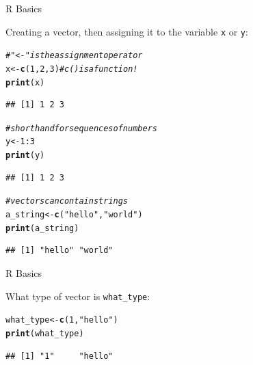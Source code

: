 \documentclass[svgnames,smaller]{beamer}\usepackage[]{graphicx}\usepackage[]{color}
\makeatletter
\newcommand{\hlnum}[1]{\textcolor[rgb]{0.686,0.059,0.569}{#1}}%
\newcommand{\hlstr}[1]{\textcolor[rgb]{0.192,0.494,0.8}{#1}}%
\newcommand{\hlcom}[1]{\textcolor[rgb]{0.678,0.584,0.686}{\textit{#1}}}%
\newcommand{\hlopt}[1]{\textcolor[rgb]{0,0,0}{#1}}%
\newcommand{\hlstd}[1]{\textcolor[rgb]{0.345,0.345,0.345}{#1}}%
\newcommand{\hlkwb}[1]{\textcolor[rgb]{0.69,0.353,0.396}{#1}}%
\newcommand{\hlkwd}[1]{\textcolor[rgb]{0.737,0.353,0.396}{\textbf{#1}}}%
\newenvironment{kframe}{%
 \def\at@end@of@kframe{}%
 \ifinner\ifhmode%
  \def\at@end@of@kframe{\end{minipage}}%
  \begin{minipage}{\columnwidth}%
 \fi\fi%
 \def\FrameCommand##1{\hskip\@totalleftmargin \hskip-\fboxsep
 \colorbox{shadecolor}{##1}\hskip-\fboxsep
     \hskip-\linewidth \hskip-\@totalleftmargin \hskip\columnwidth}%
 \MakeFramed {\advance\hsize-\width
   \@totalleftmargin\z@ \linewidth\hsize
   \@setminipage}}%
 {\par\unskip\endMakeFramed%
 \at@end@of@kframe}
\newenvironment{knitrout}{}{} %
\makeatother
\begin{document}
\begin{frame}[fragile]{R Basics}

Creating a vector, then assigning it to the variable \texttt{x} or \texttt{y}:

\begin{knitrout}\scriptsize
{}\color{fgcolor}\begin{kframe}
\begin{alltt}
\hlcom{# "<-" is the assignment operator}
\hlstd{x} \hlkwb{<-} \hlkwd{c}\hlstd{(}\hlnum{1}\hlstd{,} \hlnum{2}\hlstd{,} \hlnum{3}\hlstd{)} \hlcom{# c() is a function! }
\hlkwd{print}\hlstd{(x)}
\end{alltt}
\begin{verbatim}
## [1] 1 2 3
\end{verbatim}
\begin{alltt}
\hlcom{# short hand for sequences of numbers}
\hlstd{y} \hlkwb{<-} \hlnum{1}\hlopt{:}\hlnum{3}
\hlkwd{print}\hlstd{(y)}
\end{alltt}
\begin{verbatim}
## [1] 1 2 3
\end{verbatim}
\begin{alltt}
\hlcom{# vectors can contain strings}
\hlstd{a_string} \hlkwb{<-} \hlkwd{c}\hlstd{(}\hlstr{"hello"}\hlstd{,} \hlstr{"world"}\hlstd{)}
\hlkwd{print}\hlstd{(a_string)}
\end{alltt}
\begin{verbatim}
## [1] "hello" "world"
\end{verbatim}
\end{kframe}
\end{knitrout}

\end{frame}


\begin{frame}[fragile]{R Basics}

What type of vector is \texttt{what\_type}:

\begin{knitrout}\scriptsize
{}\color{fgcolor}\begin{kframe}
\begin{alltt}
\hlstd{what_type} \hlkwb{<-} \hlkwd{c}\hlstd{(}\hlnum{1}\hlstd{,} \hlstr{"hello"}\hlstd{)}
\hlkwd{print}\hlstd{(what_type)}
\end{alltt}
\begin{verbatim}
## [1] "1"     "hello"
\end{verbatim}
\end{kframe}
\end{knitrout}

\end{frame}
\end{document}
